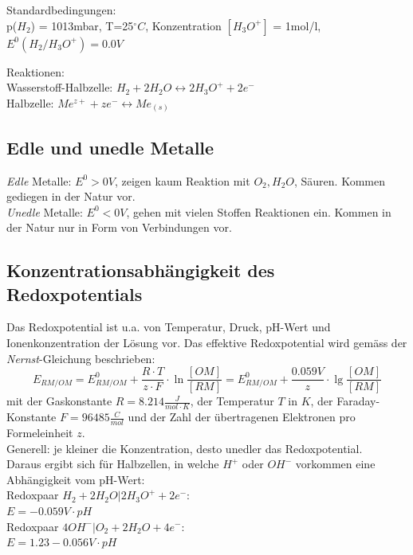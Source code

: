 Standardbedingungen:\\
p($H_2$) = 1013mbar, T=25$^\circ C$, Konzentration $[H_3O^+]$ = 1mol/l, $E^0(H_2/H_3O^+) = 0.0V$

Reaktionen: \\
Wasserstoff-Halbzelle: $H_2 + 2H_2O \leftrightarrow 2 H_3O^+ + 2 e^-$ \\
Halbzelle: $Me^{z+} + z e^- \leftrightarrow Me_{(s)}$ \\


\subsection{Edle und unedle Metalle}
\emph{Edle} Metalle: $E^0 > 0V$, zeigen kaum Reaktion mit $O_2, H_2O$, Säuren. Kommen gediegen in der Natur vor. \\

\emph{Unedle} Metalle: $E^0 < 0V$, gehen mit vielen Stoffen Reaktionen ein. Kommen in der Natur nur in Form von Verbindungen vor. \\

\subsection{Konzentrationsabhängigkeit des Redoxpotentials}
Das Redoxpotential ist u.a. von Temperatur, Druck, pH-Wert und Ionenkonzentration der Lösung vor. Das effektive Redoxpotential wird gemäss der \emph{Nernst}-Gleichung beschrieben:
\begin{equation*}
	E_{RM/OM} = E^0_{RM/OM} + \frac{R \cdot T}{z \cdot F} \cdot \ln\frac{[OM]}{[RM]} =  E^0_{RM/OM} + \frac{0.059V}{z} \cdot \lg\frac{[OM]}{[RM]}
\end{equation*}
mit der Gaskonstante $R=8.214\frac{J}{mol \cdot K}$, der Temperatur $T$ in $K$, der Faraday-Konstante $F=96485\frac{C}{mol}$ und der Zahl der übertragenen Elektronen pro Formeleinheit $z$. \\

Generell: je kleiner die Konzentration, desto unedler das Redoxpotential. \\

Daraus ergibt sich für Halbzellen, in welche $H^+$ oder $OH^-$ vorkommen eine Abhängigkeit vom pH-Wert: \\
Redoxpaar $H_2 + 2 H_2O | 2 H_3O^+ + 2 e^-$: \\ $E = -0.059V \cdot pH$ \\
Redoxpaar $4 OH^- | O_2 + 2 H_2O + 4 e^-$: \\ $E = 1.23 - 0.056V \cdot pH$ \\

